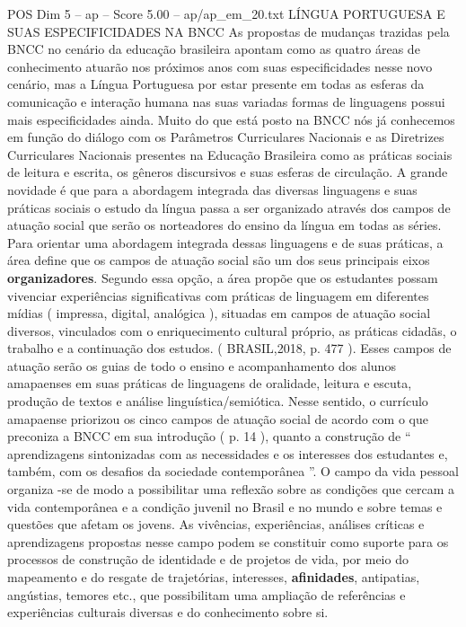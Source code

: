 \begin{textsample}{POS Dim 5 – ap – Score 5.00 – ap/ap\_em\_20.txt}  \label{ex:f5_pos_168}
LÍNGUA PORTUGUESA E SUAS ESPECIFICIDADES NA BNCC As propostas de mudanças trazidas pela BNCC no cenário da educação brasileira apontam como as quatro áreas de conhecimento atuarão nos próximos anos com suas especificidades nesse novo cenário, mas a Língua Portuguesa por estar presente em todas as esferas da comunicação e interação humana nas suas variadas formas de linguagens possui mais especificidades ainda.
Muito do que está posto na BNCC nós já conhecemos em função do diálogo com os Parâmetros Curriculares Nacionais e as Diretrizes Curriculares Nacionais presentes na Educação Brasileira como as práticas sociais de leitura e escrita, os gêneros discursivos e suas esferas de circulação.
A grande novidade é que para a abordagem integrada das diversas linguagens e suas práticas sociais o estudo da língua passa a ser organizado através dos campos de atuação social que serão os norteadores do ensino da língua em todas as séries.
Para orientar uma abordagem integrada dessas linguagens e de suas práticas, a área define que os campos de atuação social são um dos seus principais eixos \textbf{organizadores}.
Segundo essa opção, a área propõe que os estudantes possam vivenciar experiências significativas com práticas de linguagem em diferentes mídias ( impressa, digital, analógica ), situadas em campos de atuação social diversos, vinculados com o enriquecimento cultural próprio, as práticas cidadãs, o trabalho e a continuação dos estudos. ( BRASIL,2018, p. 477 ).
Esses campos de atuação serão os guias de todo o ensino e acompanhamento dos alunos amapaenses em suas práticas de linguagens de oralidade, leitura e escuta, produção de textos e análise linguística/semiótica.
Nesse sentido, o currículo amapaense priorizou os cinco campos de atuação social de acordo com o que preconiza a BNCC em sua introdução ( p. 14 ), quanto a construção de “ aprendizagens sintonizadas com as necessidades e os interesses dos estudantes e, também, com os desafios da sociedade contemporânea ”.
O campo da vida pessoal organiza -se de modo a possibilitar uma reflexão sobre as condições que cercam a vida contemporânea e a condição juvenil no Brasil e no mundo e sobre temas e questões que afetam os jovens.
As vivências, experiências, análises críticas e aprendizagens propostas nesse campo podem se constituir como suporte para os processos de construção de identidade e de projetos de vida, por meio do mapeamento e do resgate de trajetórias, interesses, \textbf{afinidades}, antipatias, angústias, temores etc., que possibilitam uma ampliação de referências e experiências culturais diversas e do conhecimento sobre si.

\end{textsample}

